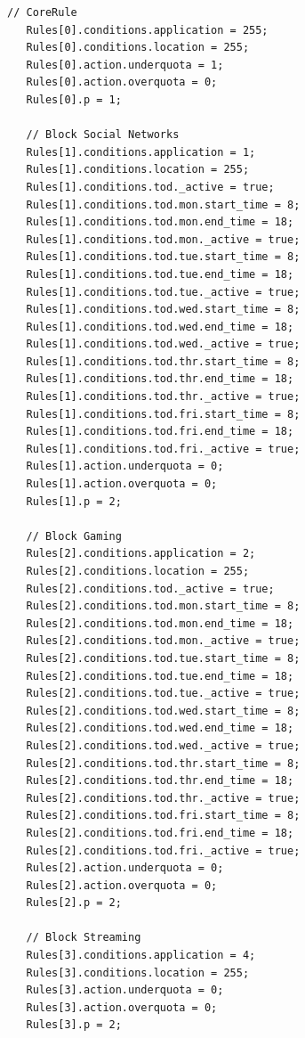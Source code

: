\singlespacing
\begin{lstlisting}[caption=Parental-Control-Rules-based Plan Model,
  label=PC_Listing]
   // CoreRule
   Rules[0].conditions.application = 255;
   Rules[0].conditions.location = 255;
   Rules[0].action.underquota = 1;
   Rules[0].action.overquota = 0;
   Rules[0].p = 1;

   // Block Social Networks
   Rules[1].conditions.application = 1;
   Rules[1].conditions.location = 255;
   Rules[1].conditions.tod._active = true;
   Rules[1].conditions.tod.mon.start_time = 8;
   Rules[1].conditions.tod.mon.end_time = 18;
   Rules[1].conditions.tod.mon._active = true;
   Rules[1].conditions.tod.tue.start_time = 8;
   Rules[1].conditions.tod.tue.end_time = 18;
   Rules[1].conditions.tod.tue._active = true;
   Rules[1].conditions.tod.wed.start_time = 8;
   Rules[1].conditions.tod.wed.end_time = 18;
   Rules[1].conditions.tod.wed._active = true;
   Rules[1].conditions.tod.thr.start_time = 8;
   Rules[1].conditions.tod.thr.end_time = 18;
   Rules[1].conditions.tod.thr._active = true;
   Rules[1].conditions.tod.fri.start_time = 8;
   Rules[1].conditions.tod.fri.end_time = 18;
   Rules[1].conditions.tod.fri._active = true;
   Rules[1].action.underquota = 0;
   Rules[1].action.overquota = 0;
   Rules[1].p = 2;

   // Block Gaming
   Rules[2].conditions.application = 2;
   Rules[2].conditions.location = 255;
   Rules[2].conditions.tod._active = true;
   Rules[2].conditions.tod.mon.start_time = 8;
   Rules[2].conditions.tod.mon.end_time = 18;
   Rules[2].conditions.tod.mon._active = true;
   Rules[2].conditions.tod.tue.start_time = 8;
   Rules[2].conditions.tod.tue.end_time = 18;
   Rules[2].conditions.tod.tue._active = true;
   Rules[2].conditions.tod.wed.start_time = 8;
   Rules[2].conditions.tod.wed.end_time = 18;
   Rules[2].conditions.tod.wed._active = true;
   Rules[2].conditions.tod.thr.start_time = 8;
   Rules[2].conditions.tod.thr.end_time = 18;
   Rules[2].conditions.tod.thr._active = true;
   Rules[2].conditions.tod.fri.start_time = 8;
   Rules[2].conditions.tod.fri.end_time = 18;
   Rules[2].conditions.tod.fri._active = true;
   Rules[2].action.underquota = 0;
   Rules[2].action.overquota = 0;
   Rules[2].p = 2;
   
   // Block Streaming
   Rules[3].conditions.application = 4;
   Rules[3].conditions.location = 255;
   Rules[3].action.underquota = 0;
   Rules[3].action.overquota = 0;
   Rules[3].p = 2;
   
\end{lstlisting}
\doublespacing

